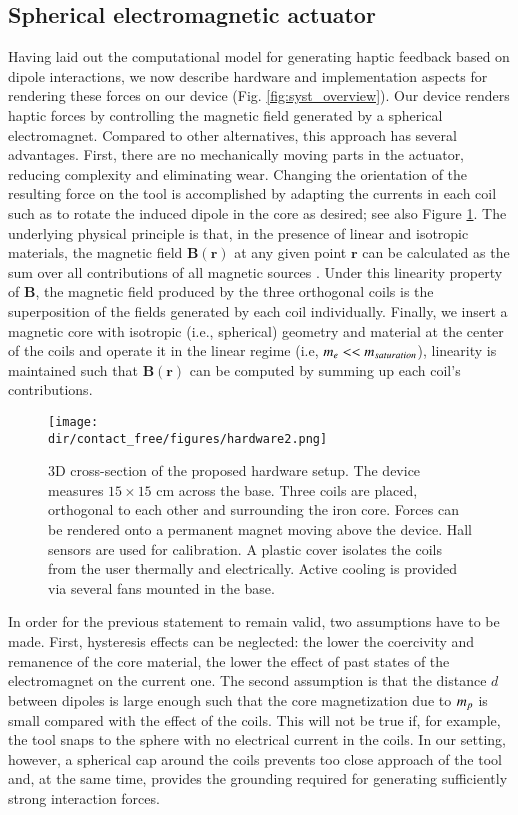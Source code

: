 \subsection{Spherical electromagnetic actuator}
Having laid out the computational model for generating haptic feedback based on dipole interactions, we now describe hardware and implementation aspects for rendering these forces on our device (Fig. \ref{fig:syst_overview}).
Our device renders haptic forces by controlling the magnetic field generated by a spherical electromagnet. Compared to other alternatives, this approach has several advantages. First, there are no mechanically moving parts in the actuator, reducing complexity and eliminating wear. Changing the orientation of the resulting force on the tool is accomplished by adapting the currents in each coil such as to rotate the induced dipole in the core as desired; see also Figure \ref{fig:hardware_labels}. The underlying physical principle is that, in the presence of linear and isotropic materials, the magnetic field $\mathbf{B(\mathbf{r})}$ at any given point $\mathbf{r}$ can be calculated as the sum over all contributions of all magnetic sources \cite{petruska2014omnimagnet}. Under this linearity property of $\mathbf{B}$, the magnetic field produced by the three orthogonal coils is the superposition of the fields generated by each coil individually. Finally, we insert a magnetic core with isotropic (i.e., spherical) geometry and material at the center of the coils and operate it in the linear regime (i.e, $m_{e} << m_{saturation}$), linearity is maintained such that $\mathbf{B(\mathbf{r})}$ can be computed by summing up each coil's contributions.
\begin{figure}[!t]
\centering
\medskip
\texttt{[image: \\dir/contact\_free/figures/hardware2.png]}
\caption{3D cross-section of the proposed hardware setup. The device measures $15 \times 15$ cm across the base. Three coils are placed, orthogonal to each other and surrounding the iron core. Forces can be rendered onto a permanent magnet moving above the device. Hall sensors are used for calibration. A plastic cover isolates the coils from the user thermally and electrically. Active cooling is provided via several fans mounted in the base.}
\label{fig:hardware_labels}
\end{figure}{}

In order for the previous statement to remain valid, two assumptions have to be made. First, hysteresis effects can be neglected: the lower the coercivity and remanence of the core material, the lower the effect of past states of the electromagnet on the current one. The second assumption is that the distance $d$ between dipoles is large enough such that the core magnetization due to $m_{p}$ is small compared with the effect of the coils. This will not be true if, for example, the tool snaps to the sphere with no electrical current in the coils. In our setting, however, a spherical cap around the coils prevents too close approach of the tool and, at the same time, provides the grounding required for generating sufficiently strong interaction forces.

